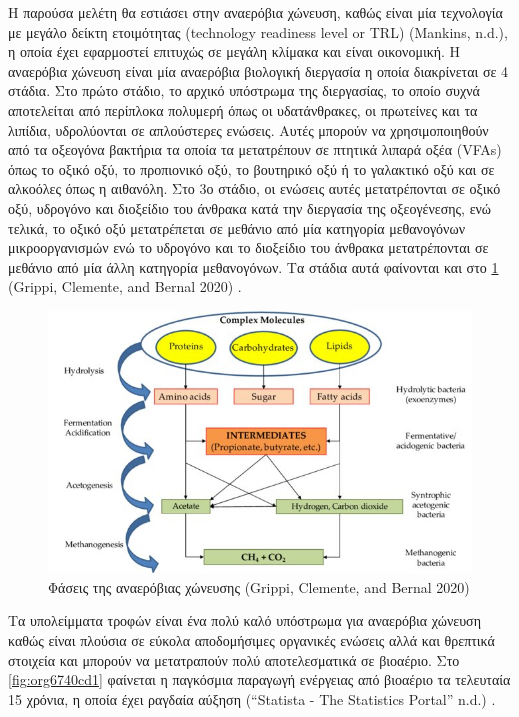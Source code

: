 \documentclass[11pt]{article}
\begin{document}
Η παρούσα μελέτη θα εστιάσει στην αναερόβια χώνευση, καθώς είναι μία τεχνολογία με μεγάλο δείκτη ετοιμότητας (technology readiness level or TRL) (Mankins, n.d.), η οποία έχει εφαρμοστεί επιτυχώς σε μεγάλη κλίμακα και είναι οικονομική. Η αναερόβια χώνευση είναι μία αναερόβια βιολογική διεργασία η οποία διακρίνεται σε 4 στάδια. Στο πρώτο στάδιο, το αρχικό υπόστρωμα της διεργασίας, το οποίο συχνά αποτελείται από περίπλοκα πολυμερή όπως οι υδατάνθρακες, οι πρωτείνες και τα λιπίδια, υδρολύονται σε απλούστερες ενώσεις. Αυτές μπορούν να χρησιμοποιηθούν από τα οξεογόνα βακτήρια τα οποία τα μετατρέπουν σε πτητικά λιπαρά οξέα (VFAs) όπως το οξικό οξύ, το προπιονικό οξύ, το βουτηρικό οξύ ή το γαλακτικό οξύ και σε αλκοόλες όπως η αιθανόλη. Στο 3ο στάδιο, οι ενώσεις αυτές μετατρέπονται σε οξικό οξύ, υδρογόνο και διοξείδιο του άνθρακα κατά την διεργασία της οξεογένεσης, ενώ τελικά, το οξικό οξύ μετατρέπεται σε μεθάνιο από μία κατηγορία μεθανογόνων μικροοργανισμών ενώ το υδρογόνο και το διοξείδιο του άνθρακα μετατρέπονται σε μεθάνιο από μία άλλη κατηγορία μεθανογόνων. Τα στάδια αυτά φαίνονται και στο \figurename \ref{fig:org39a9f7a} (Grippi, Clemente, and Bernal 2020) .

\begin{figure}[htbp]
\centering
\includegraphics[width=.9\linewidth]{./anaerobic_digestion_phases.jpg}
\caption[Φάσεις της αναερόβιας χώνευσης]{\label{fig:org39a9f7a}Φάσεις της αναερόβιας χώνευσης (Grippi, Clemente, and Bernal 2020)}
\end{figure}

Τα υπολείμματα τροφών είναι ένα πολύ καλό υπόστρωμα για αναερόβια χώνευση καθώς είναι πλούσια σε εύκολα αποδομήσιμες οργανικές ενώσεις αλλά και θρεπτικά στοιχεία και μπορούν να μετατραπούν πολύ αποτελεσματικά σε βιοαέριο. Στο \figurename \ref{fig:org6740cd1} φαίνεται η παγκόσμια παραγωγή ενέργειας από βιοαέριο τα τελευταία 15 χρόνια, η οποία έχει ραγδαία αύξηση (“Statista - The Statistics Portal” n.d.) .
\end{document}
